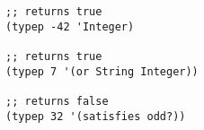\begin{lstlisting}[style=reclojureClojure]
;; returns true
(typep -42 'Integer)

;; returns true
(typep 7 '(or String Integer))

;; returns false
(typep 32 '(satisfies odd?))
\end{lstlisting}
